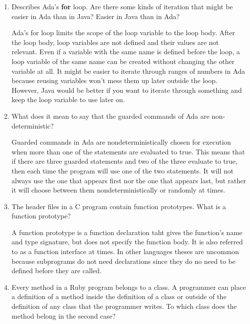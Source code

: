 \begin{enumerate}
  \item Describes Ada's \textbf{for} loop. Are there some
    kinds of iteration that might be easier in Ada than
    in Java? Easier in Java than in Ada?

  \begin{answer}
    Ada's for loop limits the scope of the loop variable to the loop body. After the loop body, loop variables are not defined and their values are not relevant. Even if a variable with the same name is defined before the loop, a loop variable of the same name can be created without changing the other variable at all. It might be easier to iterate through ranges of numbers in Ada because reusing variables won't mess them up later outside the loop. However, Java would be better if you want to iterate through something and keep the loop variable to use later on.
   
  \end{answer}

  \item What does it mean to say that the guarded commands
    of Ada are non-deterministic?

  \begin{answer}
    Guarded commands in Ada are nondeterministically chosen for execution when more than one of the statements are evaluated to true. This means that if there are three guarded statements and two of the three evaluate to true, then each time the program will use one of the two statements. It will not always use the one that appears first nor the one that appears last, but rather it will choose between them nondeterministically or randomly at times.
   
  \end{answer}

  \item The header files in a C program contain function
    prototypes. What is a function prototype?

  \begin{answer}
    A function prototype is a function declaration taht gives the function's name and type signature, but does not specify the function body. It is also referred to as a function interface at times. In other languages theses are uncommon because subprograms do not need declarations since they do no need to be defined before they are called. 
   
  \end{answer}

  \item Every method in a Ruby program belongs to a class.
    A programmer can place a definition of a method inside
    the definition of a class or outside of the definition
    of any class that the programmer writes. To which class
    does the method belong in the second case?


\end{enumerate}
